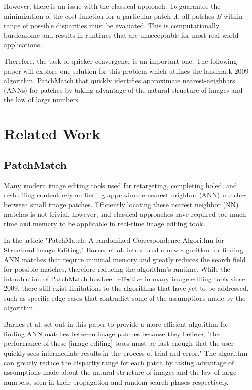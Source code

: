 \documentclass{article}
\begin{document}
However, there is an issue with the classical approach. To guarantee the minimization of the cost function for a particular patch \textit{A}, all patches \textit{B} within range of possible disparities must be evaluated. This is computationally burdensome and results in runtimes that are unacceptable for most real-world applications.

Therefore, the task of quicker convergence is an important one. The following paper will explore one solution for this problem which utilizes the landmark 2009 algorithm, PatchMatch \citep{barnes2009patchmatch} that quickly identifies approximate nearest-neighbors (ANNs) for patches by taking advantage of the natural structure of images and the law of large numbers.

\section{Related Work}
\label{related}
\subsection{PatchMatch \citep{barnes2009patchmatch}}
\label{patchmatch}
Many modern image editing tools used for retargeting, completing holed, and reshuffling content rely on finding approximate nearest neighbor (ANN) matches between small image patches. Efficiently locating these nearest neighbor (NN) matches is not trivial, however, and classical approaches have required too much time and memory to be applicable in real-time image editing tools.

In the article "PatchMatch: A randomized Correspondence Algorithm for Structural Image Editing," Barnes et al. \citep{barnes2009patchmatch} introduced a new algorithm for finding ANN matches that require minimal memory and greatly reduces the search field for possible matches, therefore reducing the algorithm's runtime. While the introduction of PatchMatch has been effective in many image editing tools since 2009, there still exist limitations to the algorithms that have yet to be addressed, such as specific edge cases that contradict some of the assumptions made by the algorithm.

Barnes et al. \citep{barnes2009patchmatch} set out in this paper to provide a more efficient algorithm for finding ANN matches between image patches because they believe, "the performance of these [image editing] tools must be fast enough that the user quickly sees intermediate results in the process of trial and error." The algorithm can greatly reduce the disparity range for each patch by taking advantage of assumptions made about the natural structure of images and the law of large numbers, seen in their propagation and random search phases respectively.
\end{document}
